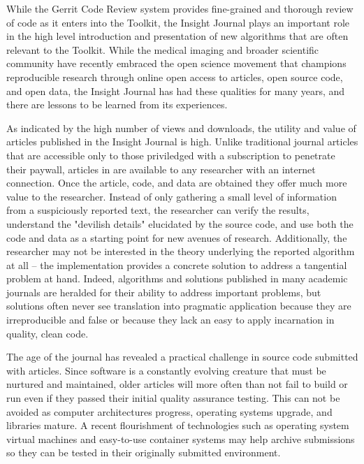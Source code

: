 \documentclass{frontiersENG} %
\begin{document}
While the Gerrit Code Review system provides fine-grained and thorough review
of code as it enters into the Toolkit, the Insight Journal plays an important
role in the high level introduction and presentation of new algorithms that
are often relevant to the Toolkit. While the medical imaging and broader
scientific community have recently embraced the open science movement that
champions reproducible research through online open access to articles, open
source code, and open data, the Insight Journal has had these qualities for
many years, and there are lessons to be learned from its experiences.

As indicated by the high number of views and downloads, the utility and value of
articles published in the Insight Journal is high.  Unlike traditional
journal articles that are accessible only to those priviledged with a
subscription to penetrate their paywall, articles in are available to any
researcher with an internet connection. Once the article, code, and data are
obtained they offer much more value to the researcher.  Instead of only gathering a
small level of information from a suspiciously reported text, the researcher
can verify the results, understand the "devilish details" elucidated by the
source code, and use both the code and data as a starting point for new
avenues of research. Additionally, the researcher may not be interested in the
theory underlying the reported algorithm at all -- the implementation provides
a concrete solution to address a tangential problem at hand. Indeed,
algorithms and solutions published in many academic journals are heralded for
their ability to address important problems, but solutions often never see
translation into pragmatic application because they are irreproducible and
false or because they lack an easy to apply incarnation in quality, clean
code.

The age of the journal has revealed a practical challenge in source code
submitted with articles. Since software is a constantly evolving creature that
must be nurtured and maintained, older articles will more often than not fail
to build or run even if they passed their initial quality assurance testing.
This can not be avoided as computer architectures progress, operating systems
upgrade, and libraries mature. A recent flourishment of technologies such as
operating system virtual machines and easy-to-use container systems may help
archive submissions so they can be tested in their originally submitted
environment.
\end{document}
